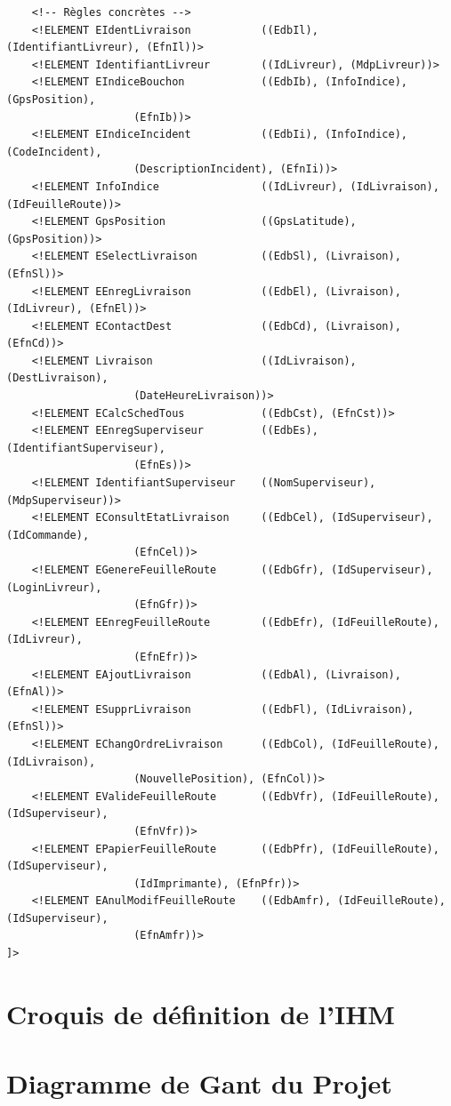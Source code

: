 \documentclass{report}
\begin{document}
\begin{appendices}
\begin{verbatim}
    <!-- Règles concrètes -->
    <!ELEMENT EIdentLivraison           ((EdbIl), (IdentifiantLivreur), (EfnIl))>
    <!ELEMENT IdentifiantLivreur        ((IdLivreur), (MdpLivreur))>
    <!ELEMENT EIndiceBouchon            ((EdbIb), (InfoIndice), (GpsPosition), 
					(EfnIb))>
    <!ELEMENT EIndiceIncident           ((EdbIi), (InfoIndice), (CodeIncident), 
					(DescriptionIncident), (EfnIi))>
    <!ELEMENT InfoIndice                ((IdLivreur), (IdLivraison), (IdFeuilleRoute))>
    <!ELEMENT GpsPosition               ((GpsLatitude), (GpsPosition))>
    <!ELEMENT ESelectLivraison          ((EdbSl), (Livraison), (EfnSl))>
    <!ELEMENT EEnregLivraison           ((EdbEl), (Livraison), (IdLivreur), (EfnEl))>
    <!ELEMENT EContactDest              ((EdbCd), (Livraison), (EfnCd))>
    <!ELEMENT Livraison                 ((IdLivraison), (DestLivraison), 
					(DateHeureLivraison))>
    <!ELEMENT ECalcSchedTous            ((EdbCst), (EfnCst))>
    <!ELEMENT EEnregSuperviseur         ((EdbEs), (IdentifiantSuperviseur), 
					(EfnEs))>
    <!ELEMENT IdentifiantSuperviseur    ((NomSuperviseur), (MdpSuperviseur))>
    <!ELEMENT EConsultEtatLivraison     ((EdbCel), (IdSuperviseur), (IdCommande), 
					(EfnCel))>
    <!ELEMENT EGenereFeuilleRoute       ((EdbGfr), (IdSuperviseur), (LoginLivreur), 
					(EfnGfr))>
    <!ELEMENT EEnregFeuilleRoute        ((EdbEfr), (IdFeuilleRoute), (IdLivreur), 
					(EfnEfr))>
    <!ELEMENT EAjoutLivraison           ((EdbAl), (Livraison), (EfnAl))>
    <!ELEMENT ESupprLivraison           ((EdbFl), (IdLivraison), (EfnSl))>
    <!ELEMENT EChangOrdreLivraison      ((EdbCol), (IdFeuilleRoute), (IdLivraison), 
					(NouvellePosition), (EfnCol))>
    <!ELEMENT EValideFeuilleRoute       ((EdbVfr), (IdFeuilleRoute), (IdSuperviseur), 
					(EfnVfr))>
    <!ELEMENT EPapierFeuilleRoute       ((EdbPfr), (IdFeuilleRoute), (IdSuperviseur), 
					(IdImprimante), (EfnPfr))>
    <!ELEMENT EAnulModifFeuilleRoute    ((EdbAmfr), (IdFeuilleRoute), (IdSuperviseur),
					(EfnAmfr))>
]>

\end{verbatim}

\chapter{Croquis de définition de l'IHM}

\chapter{Diagramme de Gant du Projet}

\end{appendices}
\end{document}
